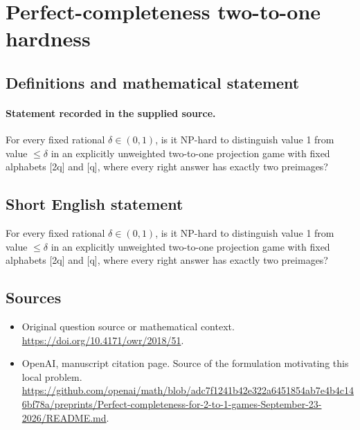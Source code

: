 \documentclass[11pt]{article}
\begin{document}
\section*{Perfect-completeness two-to-one hardness}\label{30007473}
\subsection{Definitions and mathematical statement}
\paragraph{Statement recorded in the supplied source.}
For every fixed rational $\delta \in (0,1)$, is it NP-hard to distinguish value 1 from value $\leq \delta $ in an explicitly unweighted two-to-one projection game with fixed alphabets [2q] and [q], where every right answer has exactly two preimages?
\subsection{Short English statement}
For every fixed rational $\delta \in (0,1)$, is it NP-hard to distinguish value 1 from value $\leq \delta $ in an explicitly unweighted two-to-one projection game with fixed alphabets [2q] and [q], where every right answer has exactly two preimages?
\subsection{Sources}
\begin{itemize}
\item[S1] Original question source or mathematical context.
\url{https://doi.org/10.4171/owr/2018/51}.
\item[S2] OpenAI, manuscript citation page. Source of the formulation motivating this local problem.
\url{https://github.com/openai/math/blob/adc7f1241b42e322a6451854ab7e4b4c146bf78a/preprints/Perfect-completeness-for-2-to-1-games-September-23-2026/README.md}.
\end{itemize}
\end{document}
